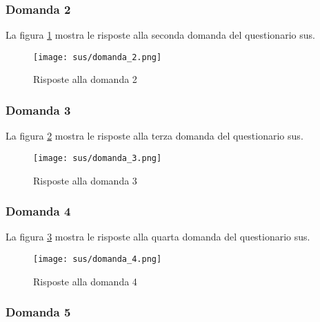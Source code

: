 \subsubsection*{Domanda 2}

\vspace{5pt}
\begin{minipage}{\textwidth}
  \par\noindent La figura \ref{fig:sus_q2} mostra le risposte alla seconda domanda del questionario \gls{sus}.
  \begin{figure}[H]
    \centering
    \texttt{[image: sus/domanda\_2.png]}
    \caption{Risposte alla domanda 2}
    \label{fig:sus_q2}
  \end{figure}
\end{minipage}

\subsubsection*{Domanda 3}

\vspace{5pt}
\begin{minipage}{\textwidth}
  \par\noindent La figura \ref{fig:sus_q3} mostra le risposte alla terza domanda del questionario \gls{sus}.
  \begin{figure}[H]
    \centering
    \texttt{[image: sus/domanda\_3.png]}
    \caption{Risposte alla domanda 3}
    \label{fig:sus_q3}
  \end{figure}
\end{minipage}

\subsubsection*{Domanda 4}

\vspace{5pt}
\begin{minipage}{\textwidth}
  \par\noindent La figura \ref{fig:sus_q4} mostra le risposte alla quarta domanda del questionario \gls{sus}.
  \begin{figure}[H]
    \centering
    \texttt{[image: sus/domanda\_4.png]}
    \caption{Risposte alla domanda 4}
    \label{fig:sus_q4}
  \end{figure}
\end{minipage}

\subsubsection*{Domanda 5}

